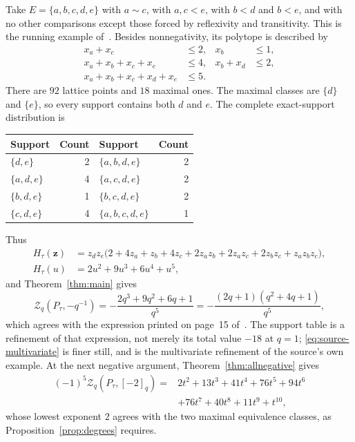 \documentclass[11pt]{article}
\numberwithin{equation}{section}
\theoremstyle{definition}
\theoremstyle{remark}
\newcommand{\qint}[1]{[#1]_q}
\newcommand{\Zeta}{\mathcal Z}
\begin{document}
Take $E=\{a,b,c,d,e\}$ with $a\sim c$, with $a,c<e$, with $b<d$ and $b<e$, and
with no other comparisons except those forced by reflexivity and transitivity.
This is the running example of~\cite[Sections~3.1 and~4.4]{AC}. Besides
nonnegativity, its polytope is described by
\begin{align*}
 x_a+x_c&\le2,& x_b&\le1,\\
 x_a+x_b+x_c+x_e&\le4,& x_b+x_d&\le2,\\
 x_a+x_b+x_c+x_d+x_e&\le5.
\end{align*}
There are $92$ lattice points and $18$ maximal ones. The maximal classes are
$\{d\}$ and $\{e\}$, so every support contains both $d$ and $e$. The complete
exact-support distribution is
\begin{center}
\begin{tabular}{@{}l r@{\qquad}l r@{}}
\toprule
Support & Count & Support & Count\\
\midrule
$\{d,e\}$ & 2 & $\{a,b,d,e\}$ & 2\\
$\{a,d,e\}$ & 4 & $\{a,c,d,e\}$ & 2\\
$\{b,d,e\}$ & 1 & $\{b,c,d,e\}$ & 2\\
$\{c,d,e\}$ & 4 & $\{a,b,c,d,e\}$ & 1\\
\bottomrule
\end{tabular}
\end{center}
Thus
\begin{align}
 H_\tau(\mathbf z)
 &=z_dz_e\bigl(2+4z_a+z_b+4z_c
       +2z_az_b+2z_az_c+2z_bz_c+z_az_bz_c\bigr),
 \label{eq:source-multivariate}\\
 H_\tau(u)&=2u^2+9u^3+6u^4+u^5,
 \label{eq:source-diagonal}
\end{align}
and Theorem~\ref{thm:main} gives
\[
 \Zeta_q(P_\tau,-q^{-1})
 =-\frac{2q^3+9q^2+6q+1}{q^5}
 =-\frac{(2q+1)(q^2+4q+1)}{q^5},
\]
which agrees with the expression printed on page~15 of~\cite{AC}. The support
table is a refinement of that expression, not merely its total value $-18$ at
$q=1$; \eqref{eq:source-multivariate} is finer still, and is the multivariate
refinement of the source's own example. At the next negative argument,
Theorem~\ref{thm:allnegative} gives
\begin{align*}
 (-1)^5\Zeta_q(P_\tau,\qint{-2})
 ={}&2t^2+13t^3+41t^4+76t^5+94t^6\\
    &+76t^7+40t^8+11t^9+t^{10},
\end{align*}
whose lowest exponent $2$ agrees with the two maximal equivalence classes, as
Proposition~\ref{prop:degrees} requires.
\end{document}

